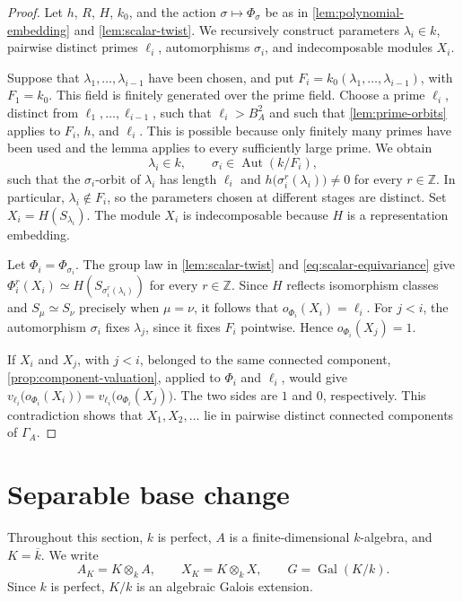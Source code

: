 \documentclass[11pt,letterpaper,reqno]{amsart}
\theoremstyle{definition}
\DeclareMathOperator{\Aut}{Aut}
\DeclareMathOperator{\Gal}{Gal}
\newcommand{\kkbar}{\overline{k}}
\begin{document}
\begin{proof}
Let $h$, $R$, $H$, $k_0$, and the action
$\sigma\mapsto\Phi_\sigma$ be as in
\cref{lem:polynomial-embedding} and \cref{lem:scalar-twist}.  We recursively construct
parameters $\lambda_i\in k$, pairwise distinct primes $\ell_i$,
automorphisms $\sigma_i$, and indecomposable modules $X_i$.

Suppose that $\lambda_1,\ldots,\lambda_{i-1}$ have been chosen, and put $F_i=k_0(\lambda_1,\ldots,\lambda_{i-1})$, with $F_1=k_0$.  This field is finitely generated over the prime field.
Choose a prime $\ell_i$, distinct from
$\ell_1,\ldots,\ell_{i-1}$, such that $\ell_i>B_A^2$ and such that
\cref{lem:prime-orbits} applies to $F_i$, $h$, and $\ell_i$.  This is
possible because only finitely many primes have been used and the lemma
applies to every sufficiently large prime.  We obtain
\[
\lambda_i\in k,
\qquad
\sigma_i\in\Aut(k/F_i),
\]
such that the $\sigma_i$-orbit of $\lambda_i$ has length $\ell_i$ and $h\bigl(\sigma_i^r(\lambda_i)\bigr)\neq0$ for every $r\in\mathbb Z$. In particular, $\lambda_i\notin F_i$, so the parameters chosen at different
stages are distinct.  Set $X_i=H(S_{\lambda_i})$. The module $X_i$ is indecomposable because $H$ is a representation
embedding.

Let $\Phi_i=\Phi_{\sigma_i}$.  The group law in \cref{lem:scalar-twist} and
\eqref{eq:scalar-equivariance} give $\Phi_i^r(X_i) \simeq H(S_{\sigma_i^r(\lambda_i)})$ for every $r\in\mathbb Z$. Since $H$ reflects isomorphism classes and
$S_\mu\simeq S_\nu$ precisely when $\mu=\nu$, it follows that $o_{\Phi_i}(X_i)=\ell_i$. For $j<i$, the automorphism $\sigma_i$ fixes $\lambda_j$, since it fixes
$F_i$ pointwise.  Hence $o_{\Phi_i}(X_j)=1$.


If $X_i$ and $X_j$, with $j<i$, belonged to the same connected component,
\cref{prop:component-valuation}, applied to $\Phi_i$ and $\ell_i$, would
give $v_{\ell_i}\bigl(o_{\Phi_i}(X_i)\bigr)=v_{\ell_i}\bigl(o_{\Phi_i}(X_j)\bigr)$. The two sides are $1$ and $0$, respectively.  This contradiction shows that
$X_1,X_2,\ldots$ lie in pairwise distinct connected components of
$\Gamma_A$.
\end{proof}

\section{Separable base change}\label{sec:base-change}

Throughout this section, $k$ is perfect, $A$ is a finite-dimensional
$k$-algebra, and $K=\kkbar$.  We write
\[
A_K=K\otimes_kA,
\qquad
X_K=K\otimes_kX,
\qquad
G=\Gal(K/k).
\]
Since $k$ is perfect, $K/k$ is an algebraic Galois extension.
\end{document}
